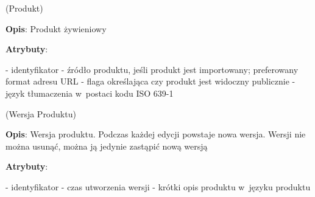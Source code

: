 \begin{enumerate}[label={\textbf{KAT/\protect\threedigits{\theenumi}}}, wide, labelwidth=!, labelindent=0pt, labelsep=0pt, series=reqs]
%
%

    \label{kat:Product} (Produkt)

    \textbf{Opis}: Produkt żywieniowy
    \par
    \textbf{Atrybuty}:
    \begin{itemize}[series=atr, wide, align=left, leftmargin=190pt]
        \label{kat:Product:id}- identyfikator
        \label{kat:Product:source}- źródło produktu, jeśli produkt jest importowany; preferowany format adresu URL
        \label{kat:Product:isPublic}- flaga określająca czy produkt jest widoczny publicznie
        \label{kat:Product:language}- język tłumaczenia w~postaci kodu ISO 639-1
    \end{itemize}

    \label{kat:ProductVersion} (Wersja Produktu)

    \textbf{Opis}: Wersja produktu. Podczas każdej edycji powstaje nowa wersja. Wersji nie można usunąć, można ją jedynie zastąpić nową wersją
    \par
    \textbf{Atrybuty}:
    \begin{itemize}[series=atr, wide, align=left, leftmargin=190pt]
        \label{kat:ProductVersion:id}- identyfikator
        \label{kat:ProductVersion:createdDate}- czas utworzenia wersji
        \label{kat:ProductVersion:description}- krótki opis produktu w~języku produktu
    \end{itemize}


\end{enumerate}
